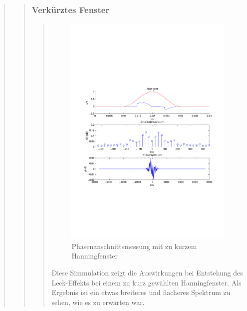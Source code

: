 \begin{quote}
\begin{quote}
        \subsubsection{Verkürztes Fenster }
		\begin{quote}
			         \begin{figure}[H]
            \centering
                \includegraphics[scale=0.6, trim = 1.5cm 7cm 1.5cm 8.5cm,
                clip]{./Bilder/Phasenanschnittsmessungmithanningfensterleckeffekt}
                    \caption{Phasenanschnittsmessung mit zu kurzem Hanningfenster}
            \end{figure}
        
        
        Diese Simmulation zeigt die Auswirkungen bei Entstehung des
        Leck-Effekts bei einem zu kurz gewählten Hanningfenster. Als Ergebnis ist ein
        etwas breiteres und flacheres Spektrum zu sehen, wie es zu erwarten war.
		\end{quote} %
         

\end{quote}
\end{quote}
